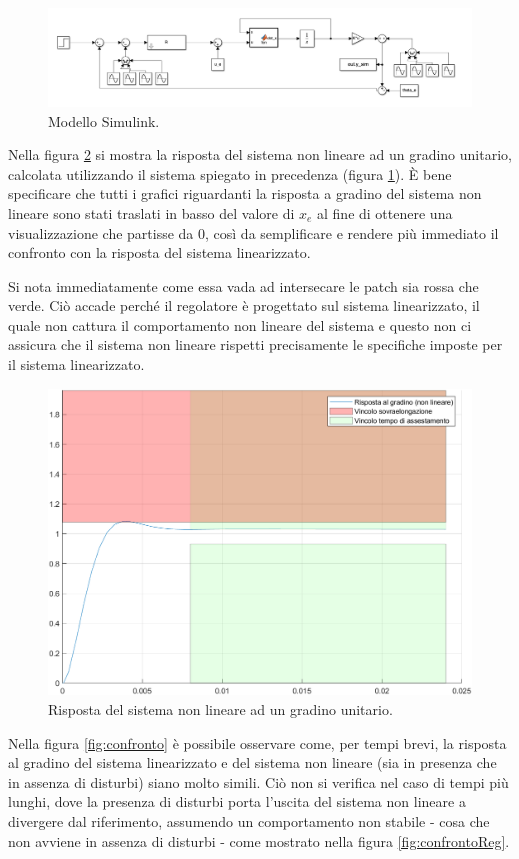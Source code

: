 \documentclass[a4paper, 11pt]{article}
\begin{document}
\begin{figure}[h!]
	\centering
	\includegraphics[width=0.75\linewidth]{./images/simulink1.png}
	\caption{Modello Simulink.}
	\label{fig:simulink}
\end{figure}

Nella figura \ref{fig:step_response_non_lin_uni} si mostra la risposta del sistema non lineare ad un gradino unitario, calcolata utilizzando il sistema spiegato in precedenza (figura \ref{fig:simulink}).
\`E bene specificare che tutti i grafici riguardanti la risposta a gradino del sistema non lineare sono stati traslati in basso del valore di $x_e$ al fine di ottenere una visualizzazione che partisse da $0$, così da semplificare
e rendere più immediato il confronto con la risposta del sistema linearizzato.

Si nota immediatamente come essa vada ad intersecare le patch sia rossa che verde. Ciò accade perché il regolatore è progettato sul sistema linearizzato, il quale non cattura il comportamento non lineare del sistema
e questo non ci assicura che il sistema non lineare rispetti precisamente le specifiche imposte per il sistema linearizzato.

\begin{figure}[h!]
	\centering
	\includegraphics[width=0.75\linewidth]{./images/stepRespNonLinUni.png}
	\caption{Risposta del sistema non lineare ad un gradino unitario.}
	\label{fig:step_response_non_lin_uni}
\end{figure}

Nella figura \ref{fig:confronto} è possibile osservare come, per tempi brevi, la risposta al gradino del sistema linearizzato e del sistema non lineare (sia in presenza che in assenza di disturbi) siano molto simili.
Ciò non si verifica nel caso di tempi più lunghi, dove la presenza di disturbi porta l'uscita del sistema non lineare a divergere dal riferimento, assumendo un comportamento non stabile - cosa che non avviene in assenza di disturbi -
come mostrato nella figura \ref{fig:confrontoReg}.
\end{document}
